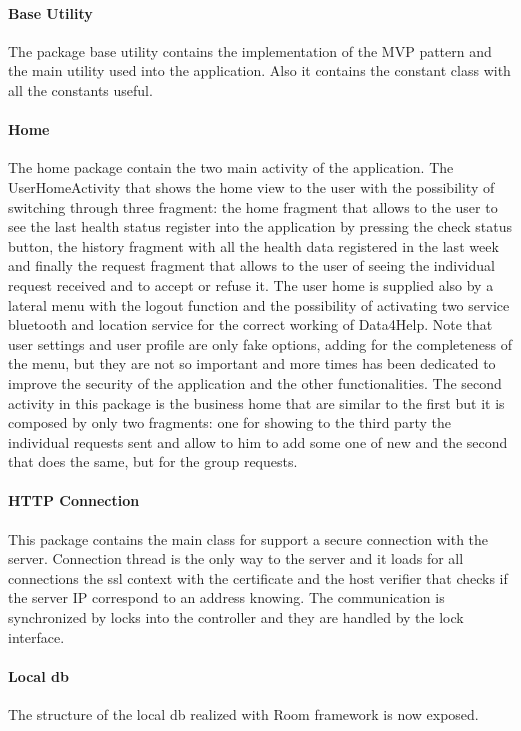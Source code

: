 \paragraph{Base Utility}
The package base utility contains the implementation of the MVP pattern and the main utility used into the application. Also it contains the constant class with all the constants useful.

\paragraph{Home}
The home package contain the two main activity of the application. The UserHomeActivity that shows the home view to the user with the possibility of switching through three fragment: the home fragment that allows to the user to see the last health status register into the application by pressing the check status button, the history fragment with all the health data registered in the last week and finally the request fragment that allows to the user of seeing the individual request received and to accept or refuse it. The user home is supplied also by a lateral menu with the logout function and the possibility of activating two service bluetooth and location service for the correct working of Data4Help. Note that user settings and user profile are only fake options, adding for the completeness of the menu, but they are not so important and more times has been dedicated to improve the security of the application and the other functionalities. The second activity in this package is the business home that are similar to the first but it is composed by only two fragments: one for showing to the third party the individual requests sent and allow to him to add some one of new and the second that does the same, but for the group requests.

\paragraph{HTTP Connection}
This package contains the main class for support a secure connection with the server. Connection thread is the only way to the server and it loads for all connections the ssl context with the certificate and the  host verifier that checks if the server IP correspond to an address knowing. The communication is synchronized by locks into the controller and they are handled by the lock interface. 

\paragraph{Local db}
The structure of the local db realized with Room framework is now exposed.

